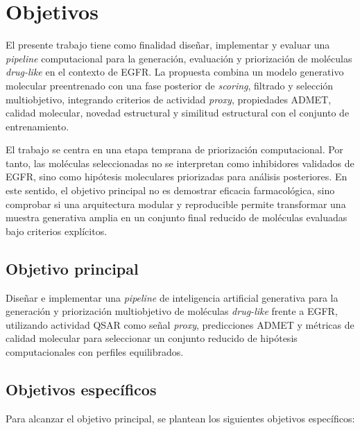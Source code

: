 \documentclass[IB]{TFUOC}%
\begin{document}
\section{Objetivos}

El presente trabajo tiene como finalidad diseñar, implementar y evaluar una \textit{pipeline} computacional para la generación, evaluación y priorización de moléculas \textit{drug-like} en el contexto de EGFR. La propuesta combina un modelo generativo molecular preentrenado con una fase posterior de \textit{scoring}, filtrado y selección multiobjetivo, integrando criterios de actividad \textit{proxy}, propiedades ADMET, calidad molecular, novedad estructural y similitud estructural con el conjunto de entrenamiento.

El trabajo se centra en una etapa temprana de priorización computacional. Por tanto, las moléculas seleccionadas no se interpretan como inhibidores validados de EGFR, sino como hipótesis moleculares priorizadas para análisis posteriores. En este sentido, el objetivo principal no es demostrar eficacia farmacológica, sino comprobar si una arquitectura modular y reproducible permite transformar una muestra generativa amplia en un conjunto final reducido de moléculas evaluadas bajo criterios explícitos.

\subsection{Objetivo principal}

Diseñar e implementar una \textit{pipeline} de inteligencia artificial generativa para la generación y priorización multiobjetivo de moléculas \textit{drug-like} frente a EGFR, utilizando actividad QSAR como señal \textit{proxy}, predicciones ADMET y métricas de calidad molecular para seleccionar un conjunto reducido de hipótesis computacionales con perfiles equilibrados.

\subsection{Objetivos específicos}

Para alcanzar el objetivo principal, se plantean los siguientes objetivos específicos:
\end{document}
